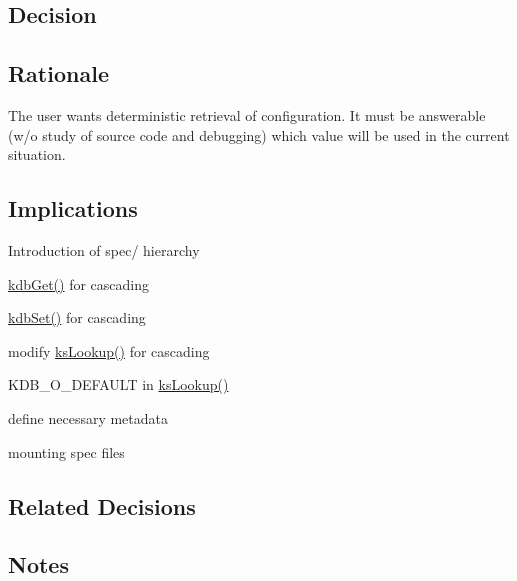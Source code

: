 \subsection*{Decision}

\subsection*{Rationale}


\begin{DoxyItemize}
\item The user wants deterministic retrieval of configuration. It must be answerable (w/o study of source code and debugging) which value will be used in the current situation.
\end{DoxyItemize}

\subsection*{Implications}


\begin{DoxyEnumerate}
\item Introduction of spec/ hierarchy
\item \hyperlink{group__kdb_ga28e385fd9cb7ccfe0b2f1ed2f62453a1}{kdb\+Get()} for cascading
\item \hyperlink{group__kdb_ga11436b058408f83d303ca5e996832bcf}{kdb\+Set()} for cascading
\item modify \hyperlink{group__keyset_gaa34fc43a081e6b01e4120daa6c112004}{ks\+Lookup()} for cascading
\item K\+D\+B\+\_\+\+O\+\_\+\+D\+E\+F\+A\+U\+LT in \hyperlink{group__keyset_gaa34fc43a081e6b01e4120daa6c112004}{ks\+Lookup()}
\item define necessary metadata
\item mounting spec files
\end{DoxyEnumerate}

\subsection*{Related Decisions}

\subsection*{Notes}